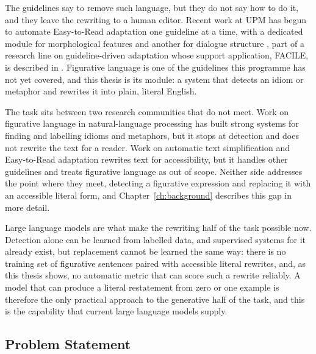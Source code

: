 The guidelines say to remove such language, but they do not say how to do it,
and they leave the rewriting to a human editor. Recent work at UPM has begun to
automate Easy-to-Read adaptation one guideline at a time, with a dedicated
module for morphological features \cite{Surez-Figueroa2023} and another for
dialogue structure \cite{Diab2024}, part of a research line on guideline-driven
adaptation whose support application, FACILE, is described in
\cite{Surez-Figueroa2024}. Figurative language is
one of the guidelines this programme has not yet covered, and this thesis is
its module: a system that detects an idiom or metaphor and rewrites it into
plain, literal English.

The task sits between two research communities that do not meet. Work on
figurative language in natural-language processing has built strong systems for
finding and labelling idioms and metaphors, but it stops at detection and does
not rewrite the text for a reader. Work on automatic text simplification and
Easy-to-Read adaptation rewrites text for accessibility, but it handles other
guidelines and treats figurative language as out of scope. Neither side
addresses the point where they meet, detecting a figurative expression and
replacing it with an accessible literal form, and Chapter~\ref{ch:background}
describes this gap in more detail.

Large language models are what make the rewriting half of the task possible
now. Detection alone can be learned from labelled data, and supervised systems
for it already exist, but replacement cannot be learned the same way: there is
no training set of figurative sentences paired with accessible literal
rewrites, and, as this thesis shows, no automatic metric that can score such a
rewrite reliably. A model that can produce a literal restatement from zero or
one example is therefore the only practical approach to the generative half of
the task, and this is the capability that current large language models supply.

\subsection{Problem Statement}

